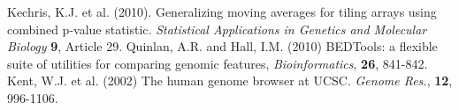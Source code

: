 \documentclass{bioinfo}
\begin{document}
%
%
%
%
%

%

%
\begin{thebibliography}{}
 Kechris, K.J. et al. (2010).
Generalizing moving averages for tiling arrays using combined p-value
statistic. {\it Statistical Applications in Genetics and Molecular Biology}
{\bf 9}, Article 29.
 Quinlan, A.R. and Hall, I.M. (2010) BEDTools: a flexible suite of utilities for comparing genomic features, {\it Bioinformatics}, {\bf 26}, 841-842.
 Kent, W.J. et al. (2002) The human genome browser at UCSC. {\it Genome Res.}, {\bf 12}, 996-1106.

\end{thebibliography}
\end{document}
